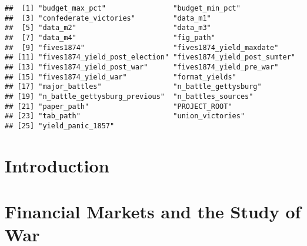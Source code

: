 

\begin{knitrout}
\color{fgcolor}\begin{kframe}
\begin{alltt}
\hlstd{()}
\end{alltt}
\begin{verbatim}
##  [1] "budget_max_pct"                "budget_min_pct"               
##  [3] "confederate_victories"         "data_m1"                      
##  [5] "data_m2"                       "data_m3"                      
##  [7] "data_m4"                       "fig_path"                     
##  [9] "fives1874"                     "fives1874_yield_maxdate"      
## [11] "fives1874_yield_post_election" "fives1874_yield_post_sumter"  
## [13] "fives1874_yield_post_war"      "fives1874_yield_pre_war"      
## [15] "fives1874_yield_war"           "format_yields"                
## [17] "major_battles"                 "n_battle_gettysburg"          
## [19] "n_battle_gettysburg_previous"  "n_battles_sources"            
## [21] "paper_path"                    "PROJECT_ROOT"                 
## [23] "tab_path"                      "union_victories"              
## [25] "yield_panic_1857"
\end{verbatim}
\end{kframe}
\end{knitrout}
\section{Introduction}
\label{sec:introduction}



\section{Financial Markets and the Study of War}
\label{sec:barg-theory-war}

